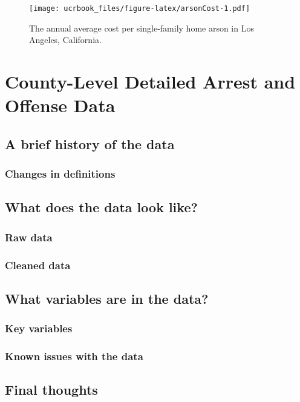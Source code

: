 \documentclass[
  12pt,
  openany]{book}
\begin{document}
\begin{figure}
\centering
\texttt{[image: ucrbook\_files/figure-latex/arsonCost-1.pdf]}
\caption{\label{fig:arsonCost}The annual average cost per single-family home arson in Los Angeles, California.}
\end{figure}

\hypertarget{county_level}{%
\chapter{County-Level Detailed Arrest and Offense Data}\label{county_level}}

\hypertarget{a-brief-history-of-the-data-4}{%
\section{A brief history of the data}\label{a-brief-history-of-the-data-4}}

\hypertarget{changes-in-definitions-4}{%
\subsection{Changes in definitions}\label{changes-in-definitions-4}}

\hypertarget{what-does-the-data-look-like-4}{%
\section{What does the data look like?}\label{what-does-the-data-look-like-4}}

\hypertarget{raw-data-3}{%
\subsection{Raw data}\label{raw-data-3}}

\hypertarget{cleaned-data}{%
\subsection{Cleaned data}\label{cleaned-data}}

\hypertarget{what-variables-are-in-the-data-4}{%
\section{What variables are in the data?}\label{what-variables-are-in-the-data-4}}

\hypertarget{key-variables-4}{%
\subsection{Key variables}\label{key-variables-4}}

\hypertarget{known-issues-with-the-data-4}{%
\subsection{Known issues with the data}\label{known-issues-with-the-data-4}}

\hypertarget{final-thoughts-4}{%
\section{Final thoughts}\label{final-thoughts-4}}

\backmatter

  
\end{document}
